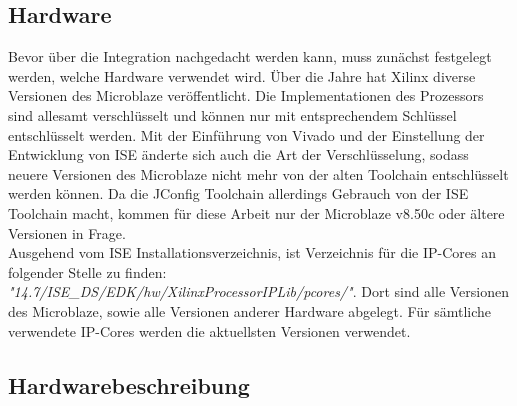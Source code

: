 \subsection{Hardware}
Bevor über die Integration nachgedacht werden kann, muss zunächst festgelegt werden, welche Hardware verwendet wird. Über die Jahre hat Xilinx diverse Versionen des Microblaze veröffentlicht. Die Implementationen des Prozessors sind allesamt verschlüsselt und können nur mit entsprechendem Schlüssel entschlüsselt werden. Mit der Einführung von Vivado und der Einstellung der Entwicklung von ISE änderte sich auch die Art der Verschlüsselung, sodass neuere Versionen des Microblaze nicht mehr von der alten Toolchain entschlüsselt werden können. Da die JConfig Toolchain allerdings Gebrauch von der ISE Toolchain macht, kommen für diese Arbeit nur der Microblaze v8.50c oder ältere Versionen in Frage.\\
Ausgehend vom ISE Installationsverzeichnis, ist Verzeichnis für die IP-Cores an folgender Stelle zu finden: \textit{"14.7/ISE\_DS/EDK/hw/XilinxProcessorIPLib/pcores/"}. Dort sind alle Versionen des Microblaze, sowie alle Versionen anderer Hardware abgelegt. Für sämtliche verwendete IP-Cores werden die aktuellsten Versionen verwendet.
\subsection{Hardwarebeschreibung}
